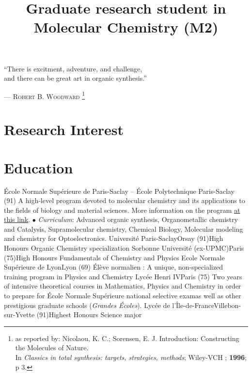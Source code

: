 \documentclass[11pt,a4paper,sans]{moderncv}
\title{Graduate research student in Molecular Chemistry (M2)}
\newcommand\Colorhref[3][cyan]{\href{#2}{\small\color{#1}#3}}
\begin{document}
\makecvtitle

{
    \vspace{-5mm}
    \centering
    \color{quote}
    \rmfamily
    ``There is excitment, adventure, and challenge,\\
    and there can be great art in organic synthesis.''\\
}

\begin{flushright}
    {\color{author}
    {---}  \textsc{Robert B. Woodward}
    \footnote{as reported by: Nicolaou, K. C.; Sorensen, E. J. Introduction: Constructing the Molecules of Nature. \\
    In \textit{Classics in total synthesis: targets, strategies, methods}; Wiley-VCH ; \textbf{1996}; p 3.
}}
\end{flushright}
%
%
%
\section{Research Interest}
%
%
%
\section{Education}
%
{{\newline}École Normale Supérieure de Paris-Saclay -- École Polytechnique}%
{Paris-Saclay (91)}{}%
{A high-level program devoted to molecular chemistry and its applications %
to the fields of biology and material sciences. %
More information on the program \Colorhref[red]{https://www.ip-paris.fr/master-2-molecular-chemistry-and-interfaces/}{at this link}. %
\medbreak
$\bullet$ \textit{Curriculum}: Advanced organic synthesis, Organometallic chemistry and Catalysis, %
Supramolecular chemistry, Chemical Biology, %
Molecular modeling and chemistry for Optoelectronics.%
}
\vspace{5mm}
%
%
%
{Université Paris-Saclay}{Orsay (91)}{High Honours}%
{Organic Chemistry specialization}
%
%
%
{Sorbonne Université (ex-UPMC)}{Paris (75)}{High Honours}%
{Fundamentals of Chemistry and Physics}
%
%
%
{Ecole Normale Supérieure de Lyon}{Lyon (69)}{}%
{Élève normalien : A unique, non-specialized training program in Physics and Chemistry}
%
%
%
{Lycée Henri IV}{Paris (75)}{}%
{Two years of intensive theoretical courses in Mathematics, Physics and Chemistry in order to prepare for École Normale Supérieure national selective examas well as other prestigious graduate schools (\emph{Grandes Écoles}).}
%
%
%
{Lycée de l'Île-de-France}{Villebon-sur-Yvette (91)}{Highest Honours}%
{Science major}
%
%
{\newpage}
%
%
%
\end{document}
